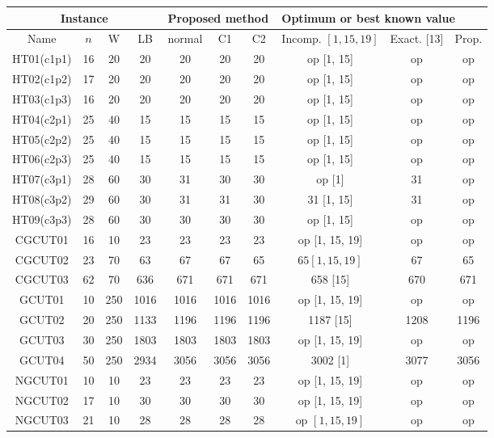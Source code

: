 \documentclass[10pt]{article}
\begin{document}
\begin{center}
\begin{tabular}{|c|c|c|c|c|c|c|c|c|c|}
\hline
\multicolumn{4}{|c|}{Instance} & \multicolumn{3}{|l|}{Proposed method} & \multicolumn{3}{|l|}{Optimum or best known value} \\
\hline
Name & $n$ & W & LB & normal & C1 & C2 & Incomp. \( [1,15,19] \) & Exact. [13] & Prop. \\
\hline
HT01(c1p1) & 16 & 20 & 20 & 20 & 20 & 20 & op [1, 15] & op & op \\
\hline
HT02(c1p2) & 17 & 20 & 20 & 20 & 20 & 20 & op [1, 15] & op & op \\
\hline
HT03(c1p3) & 16 & 20 & 20 & 20 & 20 & 20 & op [1, 15] & op & op \\
\hline
HT04(c2p1) & 25 & 40 & 15 & 15 & 15 & 15 & op [1, 15] & op & op \\
\hline
HT05(c2p2) & 25 & 40 & 15 & 15 & 15 & 15 & op [1, 15] & op & op \\
\hline
HT06(c2p3) & 25 & 40 & 15 & 15 & 15 & 15 & op [1, 15] & op & op \\
\hline
HT07(c3p1) & 28 & 60 & 30 & 31 & 30 & 30 & op [1] & 31 & op \\
\hline
HT08(c3p2) & 29 & 60 & 30 & 31 & 31 & 30 & 31 [1, 15] & 31 & op \\
\hline
HT09(c3p3) & 28 & 60 & 30 & 30 & 30 & 30 & op [1, 15] & op & op \\
\hline
CGCUT01 & 16 & 10 & 23 & 23 & 23 & 23 & op [1, 15, 19] & op & op \\
\hline
CGCUT02 & 23 & 70 & 63 & 67 & 67 & 65 & $65[1,15,19]$ & 67 & 65 \\
\hline
CGCUT03 & 62 & 70 & 636 & 671 & 671 & 671 & 658 [15] & 670 & 671 \\
\hline
GCUT01 & 10 & 250 & 1016 & 1016 & 1016 & 1016 & op [1, 15, 19] & op & op \\
\hline
GCUT02 & 20 & 250 & 1133 & 1196 & 1196 & 1196 & 1187 [15] & 1208 & 1196 \\
\hline
GCUT03 & 30 & 250 & 1803 & 1803 & 1803 & 1803 & op [1, 15, 19] & op & op \\
\hline
GCUT04 & 50 & 250 & 2934 & 3056 & 3056 & 3056 & 3002 [1] & 3077 & 3056 \\
\hline
NGCUT01 & 10 & 10 & 23 & 23 & 23 & 23 & op [1, 15, 19] & op & op \\
\hline
NGCUT02 & 17 & 10 & 30 & 30 & 30 & 30 & op [1, 15, 19] & op & op \\
\hline
NGCUT03 & 21 & 10 & 28 & 28 & 28 & 28 & op $[1,15,19]$ & op & op \\

\end{tabular}
\end{center}
\end{document}
